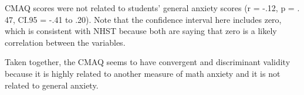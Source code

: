 \documentclass[
]{book}
\begin{document}
CMAQ scores were not related to students' general anxiety scores (r = -.12, p = . 47, CI.95 = -.41 to .20). Note that the confidence interval here includes zero, which is consistent with NHST because both are saying that zero is a likely correlation between the variables.

Taken together, the CMAQ seems to have convergent and discriminant validity because it is highly related to another measure of math anxiety and it is not related to general anxiety.

  
\end{document}
